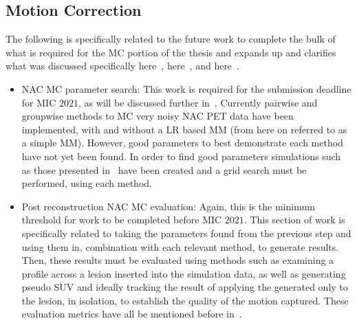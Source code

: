         \subsection{Motion Correction} \label{sec:future_work_motion_correction}
            The following is specifically related to the future work to complete the bulk of what is required for the \gls{MC} portion of the thesis and expands up and clarifies what was discussed specifically here~, here~, and here~.
            \begin{itemize}
                \item \gls{NAC} \gls{MC} parameter search: This work is required for the submission deadline for \gls{MIC} $2021$, as will be discussed further in~. Currently pairwise and groupwise methods to \gls{MC} very noisy \gls{NAC} \gls{PET} data have been implemented, with and without a \gls{LR} based \gls{MM} (from here on referred to as a simple \gls{MM}). However, good parameters to best demonstrate each method have not yet been found. In order to find good parameters simulations such as those presented in~ have been created and a grid search must be performed, using each method.
    
                \item Post reconstruction \gls{NAC} \gls{MC} evaluation: Again, this is the minimum threshold for work to be completed before \gls{MIC} $2021$. This section of work is specifically related to taking the parameters found from the previous step and using them in, combination with each relevant method, to generate results. Then, these results must be evaluated using methods such as examining a profile across a lesion inserted into the simulation data, as well as generating pseudo \gls{SUV} and ideally tracking the result of applying the  generated only to the lesion, in isolation, to establish the quality of the motion captured. These evaluation metrics have all be mentioned before in~.
    

\end{itemize}

